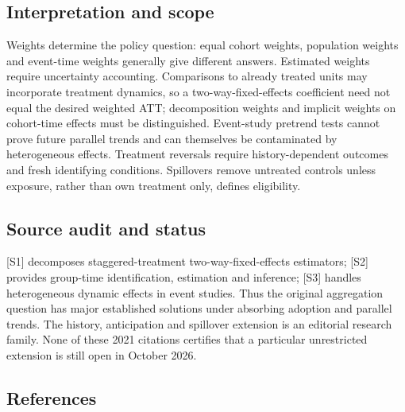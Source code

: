 \documentclass[11pt,a4paper]{article}
\begin{document}
\subsection*{Interpretation and scope}

Weights determine the policy question: equal cohort weights, population weights and event-time weights generally give different answers. Estimated weights require uncertainty accounting. Comparisons to already treated units may incorporate treatment dynamics, so a two-way-fixed-effects coefficient need not equal the desired weighted ATT; decomposition weights and implicit weights on cohort-time effects must be distinguished. Event-study pretrend tests cannot prove future parallel trends and can themselves be contaminated by heterogeneous effects. Treatment reversals require history-dependent outcomes and fresh identifying conditions. Spillovers remove untreated controls unless exposure, rather than own treatment only, defines eligibility.

\subsection*{Source audit and status}

[S1] decomposes staggered-treatment two-way-fixed-effects estimators; [S2] provides group-time identification, estimation and inference; [S3] handles heterogeneous dynamic effects in event studies. Thus the original aggregation question has major established solutions under absorbing adoption and parallel trends. The history, anticipation and spillover extension is an editorial research family. None of these 2021 citations certifies that a particular unrestricted extension is still open in October 2026.

\subsection*{References}
\end{document}
